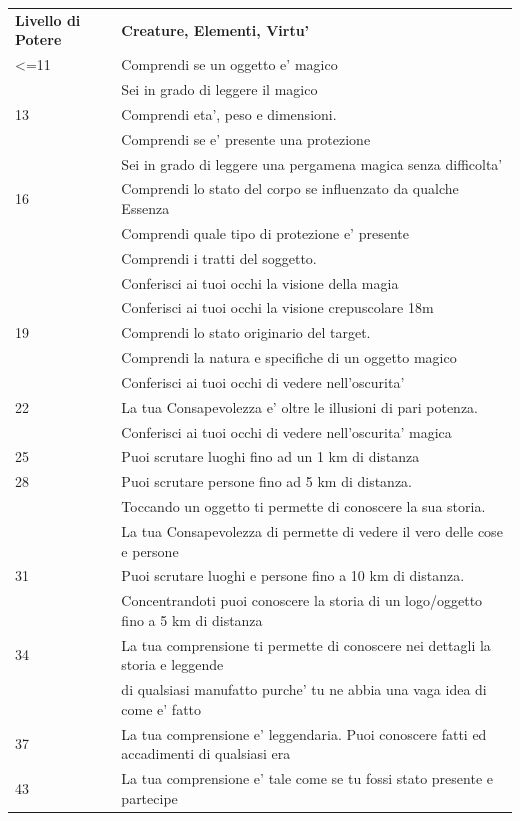 \documentclass[a4paper,11pt,twoside,openany]{book}
\begin{document}
\begin{tabularx}{0.95\textwidth}{lX}
	\toprule
	\textbf{Livello di Potere} & \textbf{Creature, Elementi, Virtu'}\\
	<=11   & Comprendi se un oggetto e’ magico  \\
	  & Sei in grado di leggere il magico  \\
	13& Comprendi eta’, peso e dimensioni. \\
	  & Comprendi se e’ presente una protezione \\
	  & Sei in grado di leggere una pergamena magica senza difficolta’   \\
	16& Comprendi lo stato del corpo se influenzato da qualche Essenza   \\
	  & Comprendi quale tipo di protezione e’ presente    \\
	  & Comprendi i tratti del soggetto.   \\
	  & Conferisci ai tuoi occhi la visione della magia   \\
	  & Conferisci ai tuoi occhi la visione crepuscolare 18m   \\
	19& Comprendi lo stato originario del target.    \\
	  & Comprendi la natura e specifiche di un oggetto magico  \\
	  & Conferisci ai tuoi occhi di vedere nell’oscurita’ \\
	22& La tua Consapevolezza e’ oltre le illusioni di pari potenza.\\
	  & Conferisci ai tuoi occhi di vedere nell’oscurita’ magica    \\
	25& Puoi scrutare luoghi fino ad un 1 km di distanza  \\
	28& Puoi scrutare persone fino ad 5 km di distanza.   \\
	  & Toccando un oggetto ti permette di conoscere la sua storia. \\
	  & La tua Consapevolezza di permette di vedere il vero delle cose e persone   \\
	31& Puoi scrutare luoghi e persone fino a 10 km di distanza.    \\
	  & Concentrandoti puoi conoscere la storia di un logo/oggetto fino a 5 km di distanza   \\
	34& La tua comprensione ti permette di conoscere nei dettagli la storia e
	leggende \\
	  & di qualsiasi manufatto purche’ tu ne abbia una vaga idea di come e’ fatto  \\
	37& La tua comprensione e’ leggendaria. Puoi conoscere fatti ed accadimenti  di qualsiasi era \\
	43& La tua comprensione e’ tale come se tu fossi stato presente e partecipe    \\
\end{tabularx}
\end{document}
